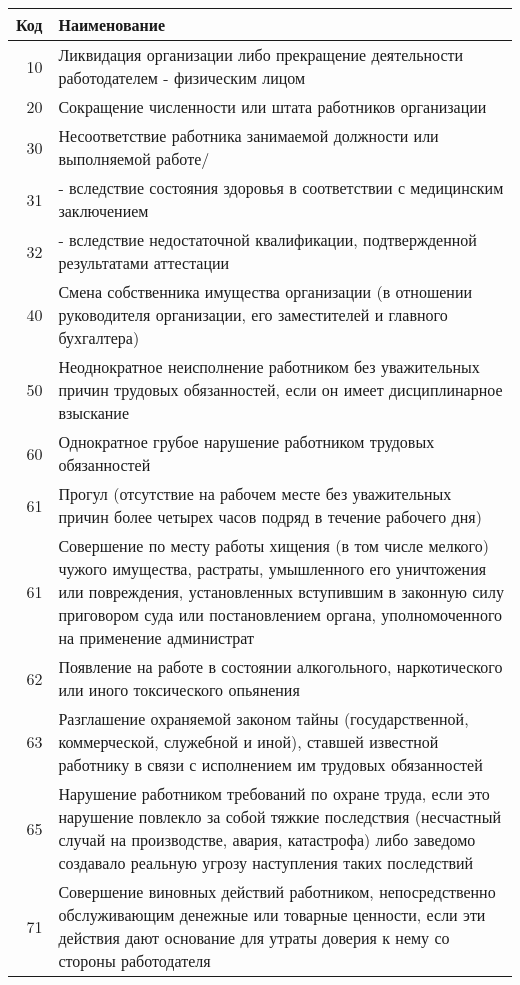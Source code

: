 \documentclass[10pt, a4paper, titlepage]{article}
\begin{document}
\begin{center}
    \begin{longtable}{rp{}}
        \hline
        \textbf{Код} & \textbf{Наименование} \\ \hline
        10 & Ликвидация организации либо прекращение деятельности работодателем - физическим лицом \\
        20 & Сокращение численности или штата работников организации \\
        30 & Несоответствие работника занимаемой должности или выполняемой работе/ \\
        31 & - вследствие состояния здоровья в соответствии с медицинским заключением \\
        32 & - вследствие недостаточной квалификации, подтвержденной результатами аттестации \\
        40 & Смена собственника имущества организации (в отношении руководителя организации, его заместителей и главного бухгалтера) \\
        50 & Неоднократное неисполнение работником без уважительных причин трудовых обязанностей, если он имеет дисциплинарное взыскание \\
        60 & Однократное грубое нарушение работником трудовых обязанностей \\
        61 & Прогул (отсутствие на рабочем месте без уважительных причин более четырех часов подряд в течение рабочего дня) \\
        61 & Совершение по месту работы хищения (в том числе мелкого) чужого имущества, растраты, умышленного его уничтожения или повреждения, установленных вступившим в законную силу приговором суда или постановлением органа, уполномоченного на применение администрат \\
        62 & Появление на работе в состоянии алкогольного, наркотического или иного токсического опьянения \\
        63 & Разглашение охраняемой законом тайны (государственной, коммерческой, служебной и иной), ставшей известной работнику в связи с исполнением им трудовых обязанностей \\
        65 & Нарушение работником требований по охране труда, если это нарушение повлекло за собой тяжкие последствия (несчастный случай на производстве, авария, катастрофа) либо заведомо создавало реальную угрозу наступления таких последствий \\
        71 & Совершение виновных действий работником, непосредственно обслуживающим денежные или товарные ценности, если эти действия дают основание для утраты доверия к нему со стороны работодателя \\

\end{longtable}
\end{center}
\end{document}
